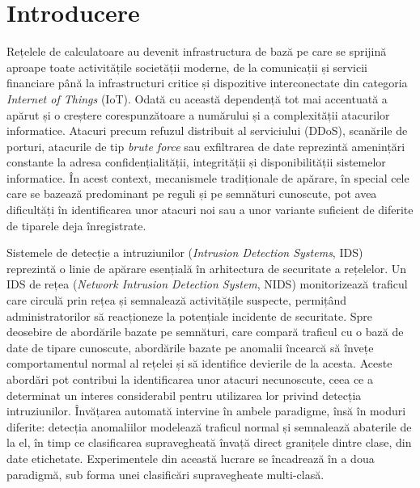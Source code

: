 \chapter{Introducere}\label{ch:intro}
\pagestyle{fancy}

Rețelele de calculatoare au devenit infrastructura de bază pe care se sprijină aproape toate activitățile societății moderne, de la comunicații și servicii financiare până la infrastructuri critice și dispozitive interconectate din categoria \textit{Internet of Things} (IoT). Odată cu această dependență tot mai accentuată a apărut și o creștere corespunzătoare a numărului și a complexității atacurilor informatice. Atacuri precum refuzul distribuit al serviciului (DDoS), scanările de porturi, atacurile de tip \textit{brute force} sau exfiltrarea de date reprezintă amenințări constante la adresa confidențialității, integrității și disponibilității sistemelor informatice. În acest context, mecanismele tradiționale de apărare, în special cele care se bazează predominant pe reguli și pe semnături cunoscute, pot avea dificultăți în identificarea unor atacuri noi sau a unor variante suficient de diferite de tiparele deja înregistrate.

Sistemele de detecție a intruziunilor (\textit{Intrusion Detection Systems}, IDS) reprezintă o linie de apărare esențială în arhitectura de securitate a rețelelor. Un IDS de rețea (\textit{Network Intrusion Detection System}, NIDS) monitorizează traficul care circulă prin rețea și semnalează activitățile suspecte, permițând administratorilor să reacționeze la potențiale incidente de securitate. Spre deosebire de abordările bazate pe semnături, care compară traficul cu o bază de date de tipare cunoscute, abordările bazate pe anomalii încearcă să învețe comportamentul normal al rețelei și să identifice devierile de la acesta. Aceste abordări pot contribui la identificarea unor atacuri necunoscute, ceea ce a determinat un interes considerabil pentru utilizarea lor privind detecția intruziunilor. Învățarea automată intervine în ambele paradigme, însă în moduri diferite: detecția anomaliilor modelează traficul normal și semnalează abaterile de la el, în timp ce clasificarea supravegheată învață direct granițele dintre clase, din date etichetate. Experimentele din această lucrare se încadrează în a doua paradigmă, sub forma unei clasificări supravegheate multi-clasă.

